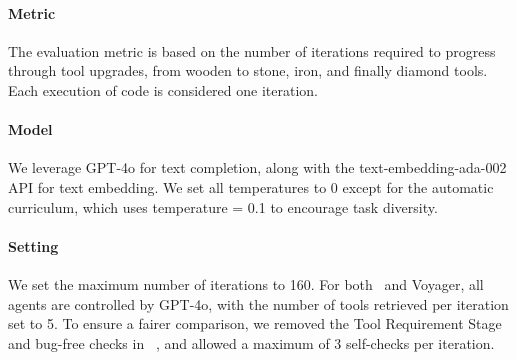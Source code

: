 \paragraph{Metric}
The evaluation metric is based on the number of iterations required to progress through tool upgrades, from wooden to stone, iron, and finally diamond tools. Each execution of code is considered one iteration.

\paragraph{Model}
We leverage GPT-4o for text completion, along with the text-embedding-ada-002 API for text embedding. We set all temperatures to
0 except for the automatic curriculum, which uses temperature = 0.1 to encourage task diversity. 

\paragraph{Setting}
We set the maximum number of iterations to 160. For both \ours\ and Voyager, all agents are controlled by GPT-4o, with the number of tools retrieved per iteration set to 5. To ensure a fairer comparison, we removed the Tool Requirement Stage and bug-free checks in \ours\ , and allowed a maximum of 3 self-checks per iteration.

